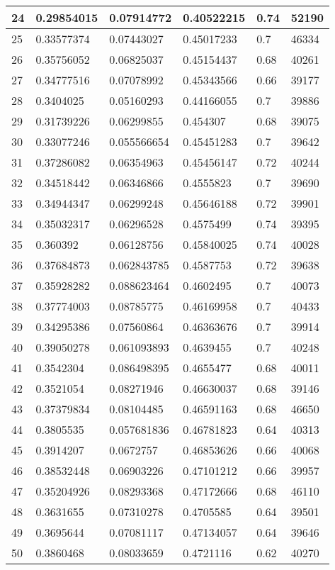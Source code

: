 \begin{longtable}{|l|l|l|l|l|l|}
24 & 0.29854015 & 0.07914772 & 0.40522215 & 0.74 & 52190 \\ \hline 
25 & 0.33577374 & 0.07443027 & 0.45017233 & 0.7 & 46334 \\ \hline 
26 & 0.35756052 & 0.06825037 & 0.45154437 & 0.68 & 40261 \\ \hline 
27 & 0.34777516 & 0.07078992 & 0.45343566 & 0.66 & 39177 \\ \hline 
28 & 0.3404025 & 0.05160293 & 0.44166055 & 0.7 & 39886 \\ \hline 
29 & 0.31739226 & 0.06299855 & 0.454307 & 0.68 & 39075 \\ \hline 
30 & 0.33077246 & 0.055566654 & 0.45451283 & 0.7 & 39642 \\ \hline 
31 & 0.37286082 & 0.06354963 & 0.45456147 & 0.72 & 40244 \\ \hline 
32 & 0.34518442 & 0.06346866 & 0.4555823 & 0.7 & 39690 \\ \hline 
33 & 0.34944347 & 0.06299248 & 0.45646188 & 0.72 & 39901 \\ \hline 
34 & 0.35032317 & 0.06296528 & 0.4575499 & 0.74 & 39395 \\ \hline 
35 & 0.360392 & 0.06128756 & 0.45840025 & 0.74 & 40028 \\ \hline 
36 & 0.37684873 & 0.062843785 & 0.4587753 & 0.72 & 39638 \\ \hline 
37 & 0.35928282 & 0.088623464 & 0.4602495 & 0.7 & 40073 \\ \hline 
38 & 0.37774003 & 0.08785775 & 0.46169958 & 0.7 & 40433 \\ \hline 
39 & 0.34295386 & 0.07560864 & 0.46363676 & 0.7 & 39914 \\ \hline 
40 & 0.39050278 & 0.061093893 & 0.4639455 & 0.7 & 40248 \\ \hline 
41 & 0.3542304 & 0.086498395 & 0.4655477 & 0.68 & 40011 \\ \hline 
42 & 0.3521054 & 0.08271946 & 0.46630037 & 0.68 & 39146 \\ \hline 
43 & 0.37379834 & 0.08104485 & 0.46591163 & 0.68 & 46650 \\ \hline 
44 & 0.3805535 & 0.057681836 & 0.46781823 & 0.64 & 40313 \\ \hline 
45 & 0.3914207 & 0.0672757 & 0.46853626 & 0.66 & 40068 \\ \hline 
46 & 0.38532448 & 0.06903226 & 0.47101212 & 0.66 & 39957 \\ \hline 
47 & 0.35204926 & 0.08293368 & 0.47172666 & 0.68 & 46110 \\ \hline 
48 & 0.3631655 & 0.07310278 & 0.4705585 & 0.64 & 39501 \\ \hline 
49 & 0.3695644 & 0.07081117 & 0.47134057 & 0.64 & 39646 \\ \hline 
50 & 0.3860468 & 0.08033659 & 0.4721116 & 0.62 & 40270 \\ \hline 
\end{longtable}